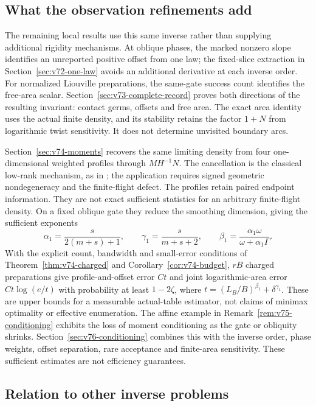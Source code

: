 \subsection{What the observation refinements add}

The remaining local results use this same inverse rather than supplying
additional rigidity mechanisms.  At oblique phases, the marked nonzero
slope identifies an unreported positive offset from one law; the
fixed-slice extraction in Section~\ref{sec:v72-one-law} avoids an
additional derivative at each inverse order.  For normalized Liouville
preparations, the same-gate success count identifies the free-area
scalar.  Section~\ref{sec:v73-complete-record} proves both directions
of the resulting invariant: contact germs, offsets and free area.
The exact area identity uses the actual finite density, and its
stability retains the factor $1+N$ from logarithmic twist sensitivity.
It does not determine unvisited boundary arcs.

Section~\ref{sec:v74-moments} recovers the same limiting density from
four one-dimensional weighted profiles through $MH^{-1}N$.
The cancellation is the classical low-rank mechanism, as in
\cite{HammHuang2019}; the application requires signed geometric
nondegeneracy and the finite-flight defect.  The profiles retain paired
endpoint information.  They are not exact sufficient statistics for an
arbitrary finite-flight density.  On a fixed oblique gate they reduce
the smoothing dimension, giving the sufficient exponents
\[
 \alpha_1=\frac{s}{2(m+s)+1},\qquad
 \gamma_1=\frac{s}{m+s+2},\qquad
 \beta_1=\frac{\alpha_1\omega}{\omega+\alpha_1\Gamma}.
\]
With the explicit count, bandwidth and small-error conditions of
Theorem~\ref{thm:v74-charged} and Corollary~\ref{cor:v74-budget},
$rB$ charged preparations give profile-and-offset error $Ct$ and joint
logarithmic-area error $Ct\log(e/t)$ with probability at least
$1-2\zeta$, where $t=(L_B/B)^{\beta_1}+\delta^{\gamma_1}$.
These are upper bounds for a measurable actual-table estimator, not
claims of minimax optimality or effective enumeration.
The affine example in Remark~\ref{rem:v75-conditioning} exhibits the
loss of moment conditioning as the gate or obliquity shrinks.
Section~\ref{sec:v76-conditioning} combines this with the inverse order,
phase weights, offset separation, rare acceptance and finite-area
sensitivity.  These sufficient estimates are not efficiency guarantees.

\subsection{Relation to other inverse problems}
\label{sec:v71-lens-comparison}

